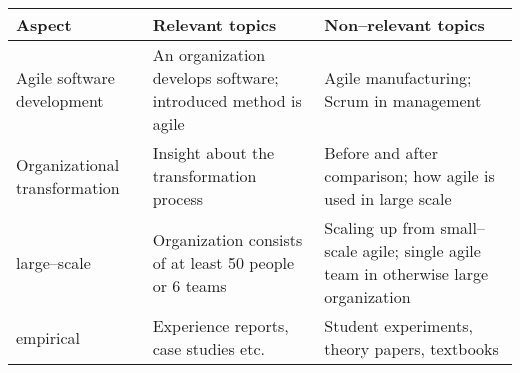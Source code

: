 \centering

 \label{inclusioncriteriatable}
\begin{tabular}{l p{16em} p{16em}}
	\bfseries{Aspect} & \bfseries{Relevant topics} & \bfseries{Non–relevant topics} \\
	\hline
	Agile software development & An organization develops software; introduced
	method is agile & Agile manufacturing; Scrum in management \\
	Organizational transformation & Insight about the transformation process &
	Before and after comparison; how agile is used in large scale \\
	large–scale & Organization consists of at least 50 people or 6 teams &
	Scaling up from small–scale agile; single agile team in otherwise large
	organization \\
	empirical & Experience reports, case studies etc. & Student experiments,
	theory papers, textbooks \\
\end{tabular}

\justify
